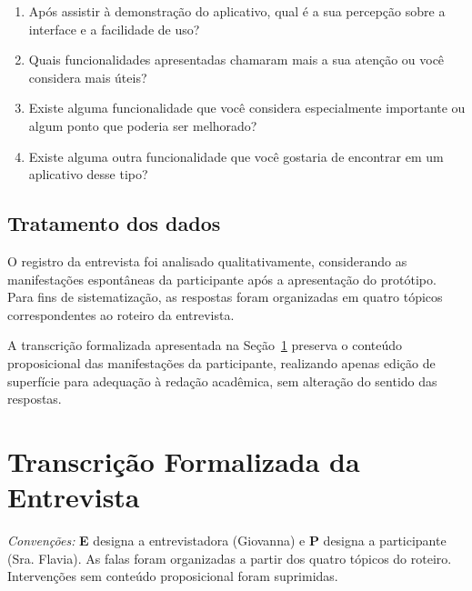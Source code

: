 \documentclass[12pt,a4paper]{article}
\newcommand{\entrevistador}{Giovanna}
\newcommand{\participante}{Sra. Flavia}
\begin{document}
\begin{enumerate}[label=\textbf{Q\arabic*.},leftmargin=1.6cm]
  \item Após assistir à demonstração do aplicativo, qual é a sua percepção sobre a interface
        e a facilidade de uso?
  \item Quais funcionalidades apresentadas chamaram mais a sua atenção ou você considera
        mais úteis?
  \item Existe alguma funcionalidade que você considera especialmente importante ou algum
        ponto que poderia ser melhorado?
  \item Existe alguma outra funcionalidade que você gostaria de encontrar em um aplicativo
        desse tipo?
\end{enumerate}

\subsection{Tratamento dos dados}

O registro da entrevista foi analisado qualitativamente, considerando as manifestações
espontâneas da participante após a apresentação do protótipo. Para fins de sistematização,
as respostas foram organizadas em quatro tópicos correspondentes ao roteiro da entrevista.

A transcrição formalizada apresentada na Seção~\ref{sec:transcricao} preserva o conteúdo
proposicional das manifestações da participante, realizando apenas edição de superfície
para adequação à redação acadêmica, sem alteração do sentido das respostas.

\section{Transcrição Formalizada da Entrevista}
\label{sec:transcricao}

\noindent\textit{Convenções:} \textbf{E} designa a entrevistadora (\entrevistador{}) e
\textbf{P} designa a participante (\participante{}). As falas foram organizadas a partir
dos quatro tópicos do roteiro. Intervenções sem conteúdo proposicional foram suprimidas.
\end{document}
